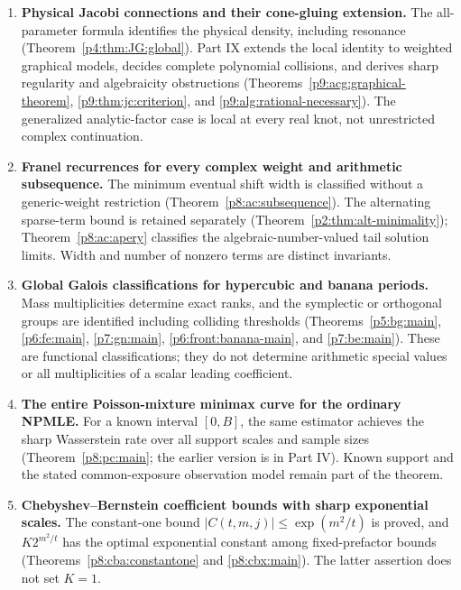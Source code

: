 \documentclass[11pt,a4paper]{article}
\theoremstyle{definition}
\theoremstyle{remark}
\numberwithin{equation}{section}
\begin{document}
\begin{enumerate}[leftmargin=*,itemsep=9pt]
\item \textbf{Physical Jacobi connections and their cone-gluing extension.}
The all-parameter formula identifies the physical density, including
resonance (Theorem~\ref{p4:thm:JG:global}). Part IX extends the local
identity to weighted graphical models, decides complete polynomial
collisions, and derives sharp regularity and algebraicity obstructions
(Theorems~\ref{p9:acg:graphical-theorem}, \ref{p9:thm:jc:criterion},
and \ref{p9:alg:rational-necessary}). The generalized analytic-factor
case is local at every real knot, not unrestricted complex continuation.

\item \textbf{Franel recurrences for every complex weight and arithmetic subsequence.}
The minimum eventual shift width is classified without a generic-weight
restriction (Theorem~\ref{p8:ac:subsequence}). The alternating sparse-term
bound is retained separately (Theorem~\ref{p2:thm:alt-minimality});
Theorem~\ref{p8:ac:apery} classifies the algebraic-number-valued tail
solution limits. Width and number of nonzero terms are distinct invariants.

\item \textbf{Global Galois classifications for hypercubic and banana periods.}
Mass multiplicities determine exact ranks, and the symplectic or
orthogonal groups are identified including colliding thresholds
(Theorems~\ref{p5:bg:main}, \ref{p6:fe:main}, \ref{p7:gn:main},
\ref{p6:front:banana-main}, and \ref{p7:be:main}). These are functional
classifications; they do not determine arithmetic special values or
all multiplicities of a scalar leading coefficient.

\item \textbf{The entire Poisson-mixture minimax curve for the ordinary NPMLE.}
For a known interval $[0,B]$, the same estimator achieves the sharp
Wasserstein rate over all support scales and sample sizes
(Theorem~\ref{p8:pc:main}; the earlier version is in Part IV).
Known support and the stated common-exposure observation model remain
part of the theorem.

\item \textbf{Chebyshev--Bernstein coefficient bounds with sharp exponential scales.}
The constant-one bound $|C(t,m,j)|\le\exp(m^2/t)$ is proved, and
$K2^{m^2/t}$ has the optimal exponential constant among fixed-prefactor
bounds (Theorems~\ref{p8:cba:constantone} and \ref{p8:cbx:main}).
The latter assertion does not set $K=1$.


\end{enumerate}
\end{document}
